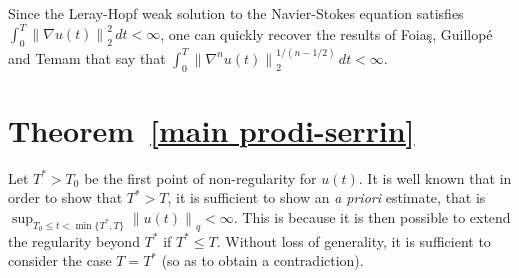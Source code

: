 \documentclass[12pt]{amsart}
\theoremstyle{remark}
\newcommand{\snormo}[1]{{\mathopen\|#1\mathclose\|}}
\begin{document}
Since the Leray-Hopf weak solution to the Navier-Stokes equation satisfies
$\int_0^T \snormo{\nabla u(t)}_2^2 \, dt < \infty$, one can quickly 
recover the results of 
Foia\c s, Guillop\'e and Temam
\cite{foias et al} that say that
$\int_0^T \snormo{\nabla^n u(t)}_2^{1/(n-1/2)} \, dt < \infty$.

\section{Theorem~\ref{main prodi-serrin}}
\label{simple}

Let $T^* > T_0$ be the first point of non-regularity for $u(t)$.
It is well known that 
in order to show that $T^* > T$,
it is sufficient to show an \emph{a priori} estimate, that is
$\sup_{T_0 \le t < \min\{T^*,T\}} \snormo{u(t)}_q < \infty$.
This is because it is then possible to extend the regularity beyond
$T^*$ if $T^* \le T$.
Without loss of generality, it is sufficient to consider the case
$T = T^*$ (so as to obtain a contradiction).
\end{document}
